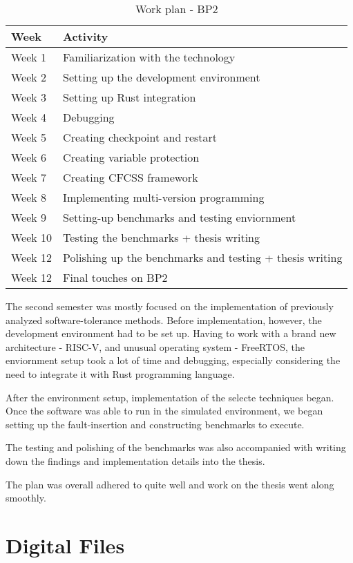 \documentclass[12pt, letterpaper]{article}
\begin{document}
\begin{appendices}
\newpage

\begin{table}[!h]
\centering
\begin{tabular}{|l|l|}
\hline
\textbf{Week} & \textbf{Activity} \\
\hline
Week 1 & Familiarization with the technology \\
Week 2 & Setting up the development environment \\
Week 3 & Setting up Rust integration \\
Week 4 & Debugging \\
Week 5 & Creating checkpoint and restart  \\
Week 6 & Creating variable protection  \\
Week 7 & Creating CFCSS framework \\
Week 8 & Implementing multi-version programming \\
Week 9 & Setting-up benchmarks and testing enviornment \\
Week 10 & Testing the benchmarks + thesis writing \\
Week 12 & Polishing up the benchmarks and testing + thesis writing \\
Week 12 & Final touches on BP2 \\
\hline
\end{tabular}
\caption{Work plan - BP2}
\label{tab:work_plan_bp2}
\end{table}

The second semester was mostly focused on the implementation of previously analyzed software-tolerance methods. Before implementation, however, the development environment had to be set up. Having to work with a brand new architecture - RISC-V, and unusual operating system - FreeRTOS, the enviornment setup took a lot of time and debugging, especially considering the need to integrate it with Rust programming language.

After the environment setup, implementation of the selecte techniques began. Once the software was able to run in the simulated environment, we began setting up the fault-insertion and constructing benchmarks to execute.

The testing and polishing of the benchmarks was also accompanied with writing down the findings and implementation details into the thesis.

The plan was overall adhered to quite well and work on the thesis went along smoothly.

\clearpage
\section{Digital Files}


\end{appendices}
\end{document}
